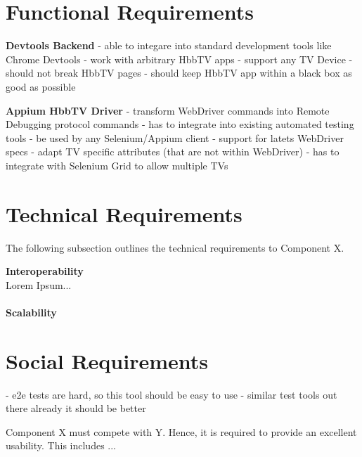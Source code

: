 \section{Functional Requirements\label{sec:reqsuba}}

\textbf{Devtools Backend}
- able to integare into standard development tools like Chrome Devtools
- work with arbitrary HbbTV apps
- support any TV Device
- should not break HbbTV pages
- should keep HbbTV app within a black box as good as possible

\textbf{Appium HbbTV Driver}
- transform WebDriver commands into Remote Debugging protocol commands
- has to integrate into existing automated testing tools
  - be used by any Selenium/Appium client
  - support for latets WebDriver specs
  - adapt TV specific attributes (that are not within WebDriver)
  - has to integrate with Selenium Grid to allow multiple TVs

\section{Technical Requirements\label{sec:techreq}}

The following subsection outlines the technical requirements to Component X.

\textbf{Interoperability}
\\
Lorem Ipsum...
\\
\\
\textbf{Scalability}
\\

\section{Social Requirements\label{sec:socreq}}

- e2e tests are hard, so this tool should be easy to use
- similar test tools out there already  it should be better

Component X must compete with Y. Hence, it is required to provide an excellent usability.
This includes ...

